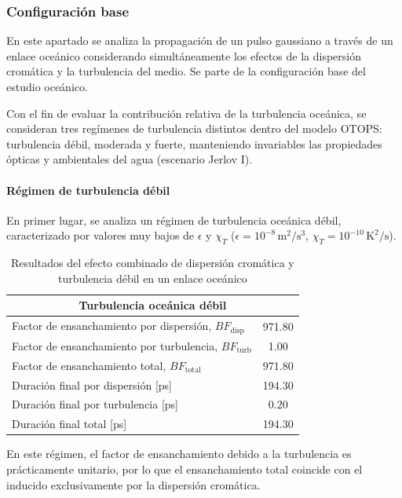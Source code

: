 \subsubsection*{Configuración base}
En este apartado se analiza la propagación de un pulso gaussiano a través de un enlace oceánico considerando simultáneamente los efectos de la dispersión cromática y la turbulencia del medio. Se parte de la configuración base del estudio oceánico.

Con el fin de evaluar la contribución relativa de la turbulencia oceánica, se consideran tres regímenes de turbulencia distintos dentro del modelo OTOPS: turbulencia débil, moderada y fuerte, manteniendo invariables las propiedades ópticas y ambientales del agua (escenario Jerlov I).

\paragraph{Régimen de turbulencia débil}
En primer lugar, se analiza un régimen de turbulencia oceánica débil, caracterizado por valores muy bajos de $\epsilon$ y $\chi_T$ ($\epsilon=10^{-8}\,\mathrm{m^2/s^3}$, $\chi_T=10^{-10}\,\mathrm{K^2/s}$).

\begin{table}[H]
\centering
\hspace*{-0.6cm}
\renewcommand{\arraystretch}{1.2}
\begin{tabular}{|l|c|}
\hline
\multicolumn{2}{|c|}{\textbf{Turbulencia oceánica débil}} \\
\hline
Factor de ensanchamiento por dispersión, $BF_{\mathrm{disp}}$ & 971.80 \\
Factor de ensanchamiento por turbulencia, $BF_{\mathrm{turb}}$ & 1.00 \\
Factor de ensanchamiento total, $BF_{\mathrm{total}}$ & 971.80 \\
\hline
Duración final por dispersión [ps] & 194.30 \\
Duración final por turbulencia [ps] & 0.20 \\
Duración final total [ps] & 194.30 \\
\hline
\end{tabular}
\caption{Resultados del efecto combinado de dispersión cromática y turbulencia débil en un enlace oceánico}
\label{tabla_oceano_comb_debil}
\end{table}


En este régimen, el factor de ensanchamiento debido a la turbulencia es prácticamente unitario, por lo que el ensanchamiento total coincide con el inducido exclusivamente por la dispersión cromática. 


